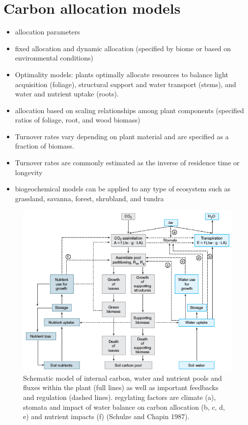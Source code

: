 \documentclass[12pt,oneside]{book}
\begin{document}
\section{Carbon allocation models}\label{carbon-allocation-models}

\begin{itemize}
\item
  allocation parameters
\item
  fixed allocation and dynamic allocation (specified by biome or based
  on environmental conditions)
\item
  Optimality models: plants optimally allocate resources to balance
  light acquisition (foliage), structural support and water transport
  (stems), and water and nutrient uptake (roots).
\item
  allocation based on scaling relationships among plant components
  (specified ratios of foliage, root, and wood biomass)
\item
  Turnover rates vary depending on plant material and are specified as a
  fraction of biomass.
\item
  Turnover rates are commonly estimated as the inverse of residence time
  or longevity
\item
  biogeochemical models can be applied to any type of ecosystem such as
  grassland, savanna, forest, shrubland, and tundra
\end{itemize}

\begin{figure}

{\centering \includegraphics[width=0.8\linewidth]{figures/chap5/f57_schulze_alloc} 

}

\caption{Schematic model of internal carbon, water and nutrient pools and fluxes within the plant (full lines) as well as important feedbacks and regulation (dashed lines). regylating factors are climate (a), stomata and impact of water balance on carbon allocation (b, c, d, e) and nutrient impacts (f) (Schulze and Chapin 1987).}\label{fig:f57}
\end{figure}
\end{document}
